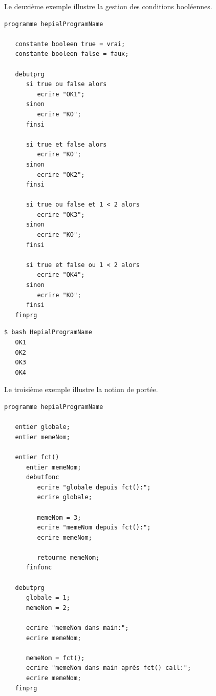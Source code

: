\documentclass[11pt,a4paper]{article}
\begin{document}
   \newpage
   \par Le deuxième exemple illustre la gestion des conditions booléennes. 
   
   \begin{lstlisting}[caption={Code Hepial pour tester la gestion booléenne}]
   programme hepialProgramName
   
   constante booleen true = vrai;
   constante booleen false = faux;
   
   debutprg
      si true ou false alors
         ecrire "OK1";
      sinon 
         ecrire "KO";
      finsi
      
      si true et false alors
         ecrire "KO";
      sinon 
         ecrire "OK2";
      finsi
      
      si true ou false et 1 < 2 alors
         ecrire "OK3";
      sinon 
         ecrire "KO";
      finsi
      
      si true et false ou 1 < 2 alors 
         ecrire "OK4";
      sinon 
         ecrire "KO";
      finsi
   finprg
   \end{lstlisting} 
   
   \begin{lstlisting}[language=bash,caption={Résultat du test de la gestion booléenne}]
   $ bash HepialProgramName
   OK1
   OK2
   OK3
   OK4
   \end{lstlisting} 
   
   \newpage
   \par Le troisième exemple illustre la notion de portée.
   
   \begin{lstlisting}[caption={Code Hepial pour tester la notion de portée}]
   programme hepialProgramName

   entier globale;
   entier memeNom;

   entier fct()
      entier memeNom;
      debutfonc
         ecrire "globale depuis fct():";
         ecrire globale;
   
         memeNom = 3;
         ecrire "memeNom depuis fct():";
         ecrire memeNom;
   
         retourne memeNom;
      finfonc
      
   debutprg
      globale = 1;
      memeNom = 2;
   
      ecrire "memeNom dans main:";
      ecrire memeNom;
   
      memeNom = fct();
      ecrire "memeNom dans main après fct() call:";
      ecrire memeNom;
   finprg
   \end{lstlisting} 
   
\end{document}
